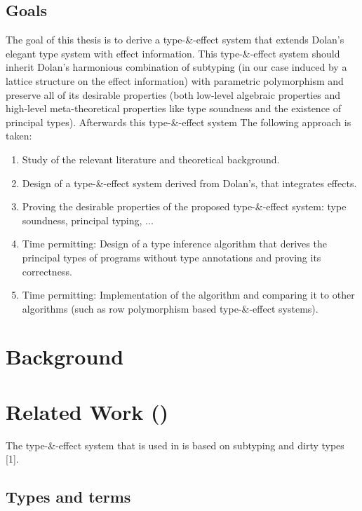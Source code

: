 \documentclass[sigplan,10pt]{acmart}\settopmatter{printfolios=true}
\begin{document}
\subsection{Goals}\label{goals}

The goal of this thesis is to derive a type-\&-effect system that
extends Dolan's elegant type system with effect information. This
type-\&-effect system should inherit Dolan's harmonious combination of
subtyping (in our case induced by a lattice structure on the effect
information) with parametric polymorphism and preserve all of its
desirable properties (both low-level algebraic properties and high-level
meta-theoretical properties like type soundness and the existence of
principal types). Afterwards this type-\&-effect system The following
approach is taken:

\begin{enumerate}
\item Study of the relevant literature and theoretical background.
\item Design of a type-\&-effect system derived from Dolan's, that integrates effects.
\item Proving the desirable properties of the proposed type-\&-effect system: type soundness, principal typing, ...
\item Time permitting: Design of a type inference algorithm that derives the principal types of programs without type annotations and proving its correctness.
\item Time permitting: Implementation of the algorithm and comparing it to other algorithms (such as row polymorphism based type-\&-effect systems).
\end{enumerate}

\section{Background}\label{background}

\section{\texorpdfstring{Related Work
(\eff)}{Related Work ()}}\label{related-work}

The type-\&-effect system that is used in \eff is based on subtyping and
dirty types {[}1{]}.

\subsection{Types and terms}\label{types-and-terms}
\end{document}
